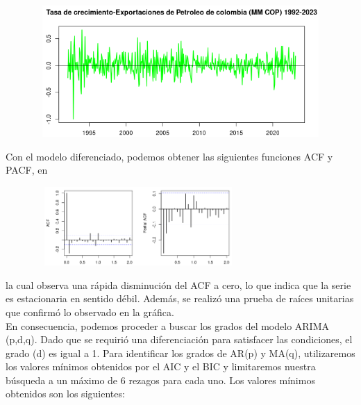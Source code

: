 \documentclass[11pt]{article}
\begin{document}
    \begin{center}
        \begin{figure}[!ht]
        \centering
        \includegraphics[width=12cm, height=5cm]{Imagenes/creci_ts.png}
        \end{figure}
    \end{center}

    Con el modelo diferenciado, podemos obtener las siguientes funciones ACF y PACF, en 
\begin{figure}
  \centering
  \includegraphics[width=8cm, height=3cm]{Imagenes/acf_pacf2.png}
\end{figure}

la cual observa una rápida disminución del ACF a cero, lo que indica que la serie es estacionaria en sentido débil. Además, se realizó una prueba de raíces unitarias que confirmó lo observado en la gráfica.\\

En consecuencia, podemos proceder a buscar los grados del modelo ARIMA (p,d,q). Dado que se requirió una diferenciación para satisfacer las condiciones, el grado (d) es igual a 1. Para identificar los grados de AR(p) y MA(q), utilizaremos los valores mínimos obtenidos por el AIC y el BIC y limitaremos nuestra búsqueda a un máximo de 6 rezagos para cada uno. Los valores mínimos obtenidos son los siguientes:
\end{document}
